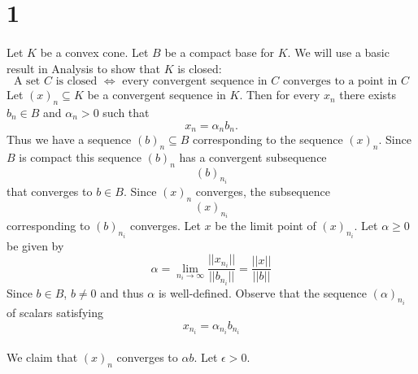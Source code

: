 \documentclass[letterpaper,12pt,oneside,onecolumn]{article}
\begin{document}
\section*{1}
\paragraph{}
Let $K$ be a convex cone. Let $B$ be a compact base for $K$.  We will use a basic result in Analysis to show that $K$ is closed:
\begin{equation}
\text{A set $C$ is closed $\iff$ every convergent sequence in $C$ converges to a point in $C$}
\label{closed:sequence}
\end{equation}
Let $(x)_n \subseteq K$ be a convergent sequence in $K$. Then for every $x_n$ there exists $b_n \in B$ and $\alpha_n > 0$ such that
$$x_n = \alpha_n b_n.$$
Thus we have a sequence $(b)_n \subseteq B$ corresponding to the sequence $(x)_n$. Since $B$ is compact this sequence $(b)_n$ has a convergent subsequence $$(b)_{n_i}$$ that converges to $b \in B$.
Since $(x)_n$ converges, the subsequence $$(x)_{n_i}$$ corresponding to $(b)_{n_i}$ converges. Let $x$ be the limit point of $(x)_{n_i}$. Let $\alpha \geq 0$ be given by
$$\alpha = \lim_{n_i \rightarrow \infty} \frac{||x_{n_i}||}{||b_{n_i}||} = \frac{||x||}{||b||}$$
Since $b\in B$, $b\neq 0$ and thus $\alpha$ is well-defined. Observe that the sequence $(\alpha)_{n_i}$ of scalars satisfying
$$x_{n_i} = \alpha_{n_i} b_{n_i}$$
\paragraph{}
We claim that $(x)_n$ converges to $\alpha b$. Let $\epsilon > 0$.
\end{document}
